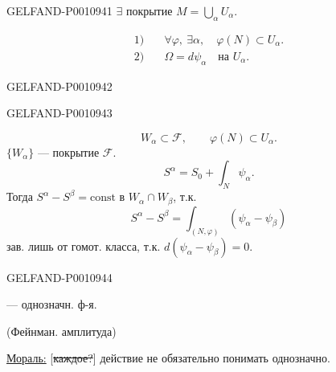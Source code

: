 \begin{GelfandAdjacentEvidence}{GELFAND-P001094}{1}
$\exists$ покрытие $M=\bigcup_\alpha U_\alpha$.

\[
\begin{aligned}
1)&\quad \forall\varphi,\ \exists\alpha,\quad \varphi(N)\subset U_\alpha.\\
2)&\quad \Omega=d\psi_\alpha\quad \text{на }U_\alpha.
\end{aligned}
\]
\end{GelfandAdjacentEvidence}
\begin{GelfandAdjacentEvidence}{GELFAND-P001094}{2}

\end{GelfandAdjacentEvidence}
\begin{GelfandAdjacentEvidence}{GELFAND-P001094}{3}


\[
W_\alpha\subset\mathcal F,\qquad \varphi(N)\subset U_\alpha.
\]
$\{W_\alpha\}$ — покрытие $\mathcal F$.
\[
S^\alpha=S_0+\int_N\psi_\alpha.
\]
Тогда $S^\alpha-S^\beta=\mathrm{const}$ в $W_\alpha\cap W_\beta$, т.к.
\[
S^\alpha-S^\beta=\int_{(N,\varphi)}(\psi_\alpha-\psi_\beta)
\]
зав. лишь от гомот. класса, т.к. $d(\psi_\alpha-\psi_\beta)=0$.

\end{GelfandAdjacentEvidence}
\begin{GelfandAdjacentEvidence}{GELFAND-P001094}{4}


 — однозначн. ф-я.

(Фейнман. амплитуда)

\underline{Мораль:} [\sout{каждое?}] действие не обязательно понимать однозначно.
\end{GelfandAdjacentEvidence}
